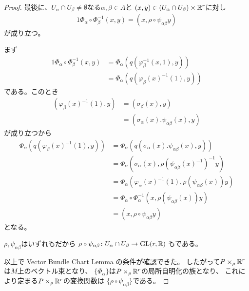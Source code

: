 \documentclass[report]{jlreq}
\begin{document}
\begin{proof}
    最後に、$U_\alpha \cap U_\beta \neq \emptyset$なる$\alpha, \beta \in A$と
    $(x, y) \in (U_\alpha \cap U_\beta) \times \mathbb{R}^r$に対し
    \begin{alignat}{1}
        \Phi_\alpha \circ \Phi_\beta^{-1} (x, y)
            = (x, \rho \circ \psi_{\alpha\beta} y)
    \end{alignat}
    が成り立つ。
    \begin{innerproof}
        まず
        \begin{alignat}{1}
            \Phi_\alpha \circ \Phi_\beta^{-1} (x, y)
                &= \Phi_\alpha(q(\varphi_\beta^{-1}(x, 1), y)) \\
                &= \Phi_\alpha(q(\varphi_\beta(x)^{-1}(1), y))
        \end{alignat}
        である。このとき
        \begin{align}
            (\varphi_\beta(x)^{-1}(1), y)
            &= (\sigma_\beta(x), y) \\
            &= (\sigma_\alpha(x) . \psi_{\alpha\beta}(x), y)
        \end{align}
        が成り立つから
        \begin{align}
            \Phi_\alpha(q(\varphi_\beta(x)^{-1}(1), y))
                &= \Phi_\alpha(q(\sigma_\alpha(x) . \psi_{\alpha\beta}(x), y)) \\
                &= \Phi_\alpha(
                    \sigma_\alpha(x),
                    \rho(\psi_{\alpha\beta}(x)^{-1})^{-1} y
                ) \\
                &= \Phi_\alpha(
                    \varphi_\alpha(x)^{-1}(1),
                    \rho(\psi_{\alpha\beta}(x)) y
                ) \\
                &= \Phi_\alpha \circ \Phi_\alpha^{-1}(
                    x,
                    \rho(\psi_{\alpha\beta}(x)) y
                ) \\
                &= (x, \rho \circ \psi_{\alpha\beta} y)
        \end{align}
        となる。
    \end{innerproof}
    $\rho, \psi_{\alpha\beta}$はいずれも{\smooth}だから
    $\rho \circ \psi_{\alpha\beta} \colon U_\alpha \cap U_\beta \to \operatorname{\mathrm{GL}}(r, \mathbb{R})$
    も{\smooth}である。

    以上で Vector Bundle Chart Lemma の条件が確認できた。
    したがって$P \times_\rho \mathbb{R}^r$は$M$上のベクトル束となり、
    $\{ \Phi_\alpha \}$は$P \times_\rho \mathbb{R}^r$の局所自明化の族となり、
    これにより定まる$P \times_\rho \mathbb{R}^r$の変換関数は
    $\{ \rho \circ \psi_{\alpha\beta} \}$である。
\end{proof}
\end{document}

